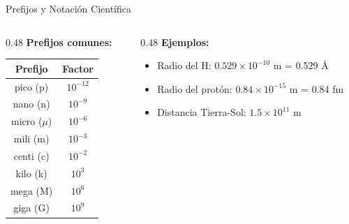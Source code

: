 \documentclass[aspectratio=169,xcolor=dvipsnames]{beamer}
\begin{document}
\begin{frame}{Prefijos y Notación Científica}
	\begin{columns}[T]
		\begin{column}{0.48\textwidth}
			\textbf{Prefijos comunes:}
			\begin{table}
				\small
				\begin{tabular}{c|c}
					\textbf{Prefijo} & \textbf{Factor} \\
					\hline
					pico (p) & $10^{-12}$ \\
					nano (n) & $10^{-9}$ \\
					micro ($\mu$) & $10^{-6}$ \\
					mili (m) & $10^{-3}$ \\
					centi (c) & $10^{-2}$ \\
					kilo (k) & $10^3$ \\
					mega (M) & $10^6$ \\
					giga (G) & $10^9$
				\end{tabular}
			\end{table}
		\end{column}
		\begin{column}{0.48\textwidth}
			\textbf{Ejemplos:}
			\begin{itemize}
				\item Radio del H: $0.529 \times 10^{-10}$ m = \alert{0.529 \AA}
				\item Radio del protón: $0.84 \times 10^{-15}$ m = \alert{0.84 fm}
				\item Distancia Tierra-Sol: $1.5 \times 10^{11}$ m
			\end{itemize}
		\end{column}
	\end{columns}
\end{frame}
\end{document}
